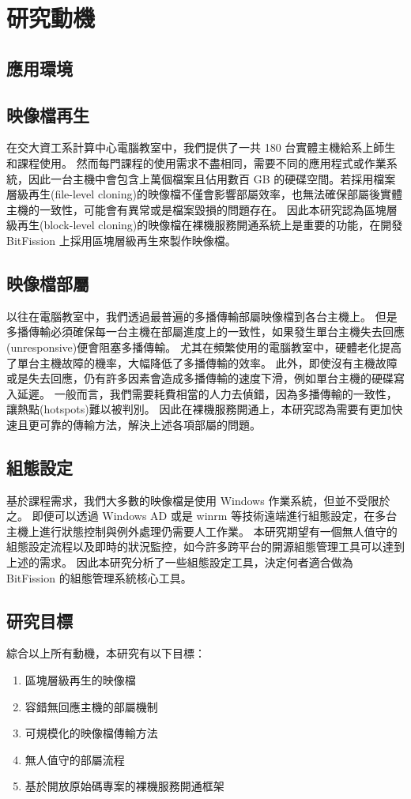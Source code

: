 \chapter{研究動機}
\section{應用環境}
\section{映像檔再生}
在交大資工系計算中心電腦教室中，我們提供了一共 180 台實體主機給系上師生和課程使用。
然而每門課程的使用需求不盡相同，需要不同的應用程式或作業系統，因此一台主機中會包含上萬個檔案且佔用數百 GB 的硬碟空間。若採用檔案層級再生(file-level cloning)的映像檔不僅會影響部屬效率，也無法確保部屬後實體主機的一致性，可能會有異常或是檔案毀損的問題存在。
因此本研究認為區塊層級再生(block-level cloning)的映像檔在裸機服務開通系統上是重要的功能，在開發 BitFission 上採用區塊層級再生來製作映像檔。
\section{映像檔部屬}
以往在電腦教室中，我們透過最普遍的多播傳輸部屬映像檔到各台主機上。
但是多播傳輸必須確保每一台主機在部屬進度上的一致性，如果發生單台主機失去回應(unresponsive)便會阻塞多播傳輸。
尤其在頻繁使用的電腦教室中，硬體老化提高了單台主機故障的機率，大幅降低了多播傳輸的效率。
此外，即使沒有主機故障或是失去回應，仍有許多因素會造成多播傳輸的速度下滑，例如單台主機的硬碟寫入延遲。
一般而言，我們需要耗費相當的人力去偵錯，因為多播傳輸的一致性，讓熱點(hotspots)難以被判別。
因此在裸機服務開通上，本研究認為需要有更加快速且更可靠的傳輸方法，解決上述各項部屬的問題。
\section{組態設定}
基於課程需求，我們大多數的映像檔是使用 Windows 作業系統，但並不受限於之。
即便可以透過 Windows AD 或是 winrm 等技術遠端進行組態設定，在多台主機上進行狀態控制與例外處理仍需要人工作業。
本研究期望有一個無人值守的組態設定流程以及即時的狀況監控，如今許多跨平台的開源組態管理工具可以達到上述的需求。
因此本研究分析了一些組態設定工具，決定何者適合做為 BitFission 的組態管理系統核心工具。

\section{研究目標}
綜合以上所有動機，本研究有以下目標：
\begin{enumerate}
\item 區塊層級再生的映像檔
\item 容錯無回應主機的部屬機制
\item 可規模化的映像檔傳輸方法
\item 無人值守的部屬流程
\item 基於開放原始碼專案的裸機服務開通框架
\end{enumerate}

